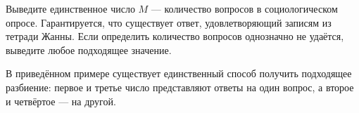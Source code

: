 \begin{problem}
\OutputFile

Выведите единственное число $M$ — количество вопросов в социологическом опросе. Гарантируется, что существует ответ, удовлетворяющий записям из тетради Жанны. Если определить количество вопросов однозначно не удаётся, выведите любое подходящее значение.

\Examples

\begin{example}
%
\end{example}

\Explanation

В приведённом примере существует единственный способ получить подходящее разбиение: первое и третье число представляют ответы на один вопрос, а второе и четвёртое — на другой.

\end{problem}